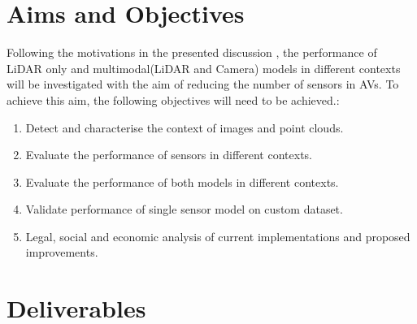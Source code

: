 \section{Aims and Objectives}
Following the motivations in the presented discussion , the performance of LiDAR only and multimodal(LiDAR and Camera) models in different contexts will be investigated with the aim of reducing the number of sensors in AVs. 
To achieve this aim, the following objectives will need to be achieved.:
\begin{enumerate}
	\item Detect and characterise the context of images and point clouds.
	\item Evaluate the performance of sensors in different contexts. 
	\item Evaluate the performance of both models in different contexts. 
	\item Validate performance of single sensor model on custom dataset. 
	\item Legal, social and economic analysis of current implementations and proposed improvements. 
\end{enumerate}

\section{Deliverables}

